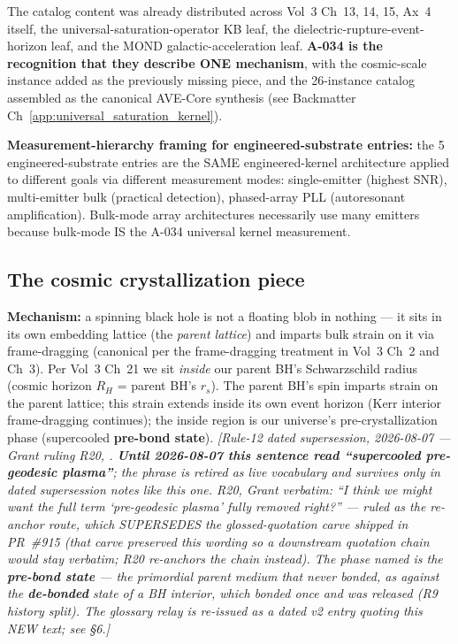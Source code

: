 The catalog content was already distributed across Vol~3 Ch~13, 14, 15,
Ax~4 itself, the universal-saturation-operator KB leaf, the
dielectric-rupture-event-horizon leaf, and the MOND galactic-acceleration
leaf. \textbf{A-034 is the recognition that they describe ONE mechanism},
with the cosmic-scale instance added as the previously missing piece, and
the 26-instance catalog assembled as the canonical AVE-Core synthesis
(see Backmatter Ch~\ref{app:universal_saturation_kernel}).

\textbf{Measurement-hierarchy framing for engineered-substrate entries:}
the 5 engineered-substrate entries are the SAME engineered-kernel
architecture applied to different goals via different measurement modes:
single-emitter (highest SNR), multi-emitter bulk (practical detection),
phased-array PLL (autoresonant amplification). Bulk-mode array
architectures necessarily use many emitters because bulk-mode IS the
A-034 universal kernel measurement.

\subsection{The cosmic crystallization piece}

\textbf{Mechanism:} a spinning black hole is not a
floating blob in nothing --- it sits in its own embedding lattice (the
\emph{parent lattice}) and imparts bulk strain on it via frame-dragging
(canonical per the frame-dragging treatment in Vol~3 Ch~2 and Ch~3). Per Vol~3 Ch~21 we sit
\emph{inside} our parent BH's Schwarzschild radius (cosmic horizon $R_H$ =
parent BH's $r_s$). The parent BH's spin imparts strain on the parent
lattice; this strain extends inside its own event horizon (Kerr interior
frame-dragging continues); the inside region is our universe's
pre-crystallization phase (supercooled \textbf{pre-bond state}). \emph{[Rule-12 dated supersession, 2026-08-07 --- Grant ruling R20, . \textbf{Until 2026-08-07 this sentence read ``supercooled pre-geodesic plasma''}; the phrase is retired as live vocabulary and survives only in dated supersession notes like this one. R20, Grant verbatim: ``I think we might want the full term `pre-geodesic plasma' fully removed right?'' --- ruled as the re-anchor route, which SUPERSEDES the glossed-quotation carve shipped in PR~\#915 (that carve preserved this wording so a downstream quotation chain would stay verbatim; R20 re-anchors the chain instead). The phase named is the \textbf{pre-bond state} --- the primordial parent medium that never bonded, as against the \textbf{de-bonded} state of a BH interior, which bonded once and was released (R9 history split). The glossary relay is re-issued as a dated v2 entry quoting this NEW text; see  \S6.]}

